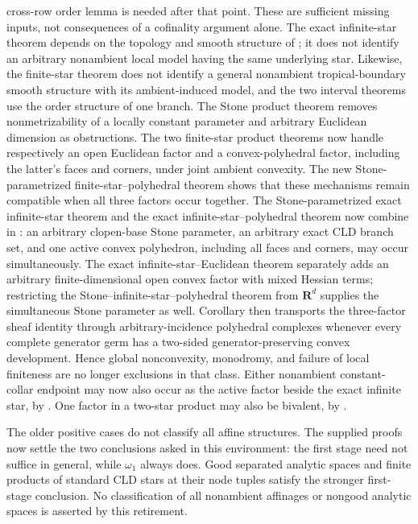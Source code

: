 cross-row order lemma is needed after that point.  These are sufficient
missing inputs, not consequences of a cofinality argument alone.
The exact infinite-star theorem depends on the topology and smooth structure
of \cite[\S6.7.3]{CLD25}; it does not identify an arbitrary nonambient local
model having the same underlying star.  Likewise, the finite-star theorem
does not identify a general nonambient tropical-boundary smooth structure
with its ambient-induced model, and the two interval theorems use the order
structure of one branch.  The Stone product theorem removes nonmetrizability
of a locally constant parameter and arbitrary Euclidean dimension as
obstructions.  The two finite-star product theorems now handle respectively
an open Euclidean factor and a convex-polyhedral factor, including the
latter's faces and corners, under joint ambient convexity.  The new
Stone-parametrized finite-star--polyhedral theorem shows that these
mechanisms remain compatible when all three factors occur together.  The
Stone-parametrized exact infinite-star theorem and the exact
infinite-star--polyhedral theorem now combine in
: an arbitrary
clopen-base Stone parameter, an arbitrary exact CLD branch set, and one
active convex polyhedron, including all faces and corners, may occur
simultaneously.  The exact infinite-star--Euclidean theorem separately adds
an arbitrary finite-dimensional open convex factor with mixed Hessian terms;
restricting the Stone--infinite-star--polyhedral theorem from \(\mathbf R^d\)
supplies the simultaneous Stone parameter as well.  Corollary
 then transports
the three-factor sheaf identity through arbitrary-incidence polyhedral
complexes whenever every complete generator germ has a two-sided
generator-preserving convex development.  Hence global nonconvexity,
monodromy, and failure of local finiteness are no longer exclusions in that
class.  Either nonambient constant-collar endpoint may now also occur as the
active factor beside the exact infinite star, by
.
One factor in a two-star product may also be bivalent, by
.

The older positive cases do not classify all affine structures. The supplied
proofs now settle the two conclusions asked in this environment: the first
stage need not suffice in general, while \(\omega_1\) always does.
Good separated analytic spaces and finite products of standard CLD stars
at their node tuples satisfy the stronger first-stage conclusion. No
classification of all nonambient affinages or nongood analytic spaces is
asserted by this retirement.


